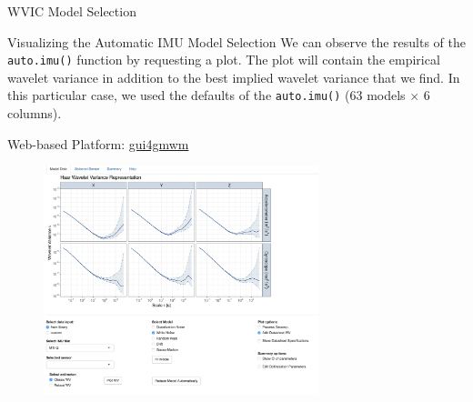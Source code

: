 \documentclass[envcountsect,usenames,dvipsnames]{beamer}
\theoremstyle{mystyle}
\begin{document}
\begin{frame}{WVIC Model Selection}

\begin{block}{Visualizing the Automatic IMU Model Selection}
We can observe the results of the {\tt auto.imu()} function by requesting a plot. The plot will contain the empirical wavelet variance in addition to the best implied wavelet variance that we find. In this particular case, we used the defaults of the {\tt auto.imu()} (63 models $\times$ 6 columns).
\end{block}

	\begin{figure}
	  \centering
	\end{figure}
\end{frame}

\begin{frame}{Web-based Platform: \href{http://shiny.science.psu.edu/szg279/gui4gmwm/}{gui4gmwm}}

		\vspace{0.3cm}
		\begin{figure}
		    \centering
		  \includegraphics[width = 8cm]{Images/gui4gmwm.png}
		\end{figure}
\end{frame}
\end{document}
